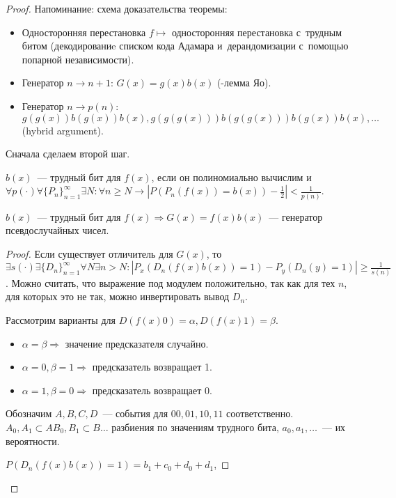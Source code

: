 \documentclass{article}
\begin{document}
\begin{proof}
	Напоминание: схема доказательства теоремы:
	\begin{itemize}
		\item Односторонняя перестановка $f \mapsto$ односторонняя перестановка
			с~трудным битом (декодированиe списком кода Адамара и~дерандомизации
			с~помощью попарной независимости).
		\item Генератор $n \rightarrow n + 1$: $G(x) = g(x) b(x)$ (-лемма
			Яо).
		\item Генератор $n \rightarrow p(n)$: $g(g(x))b(g(x))b(x),
			g(g(g(x)))b(g(g(x)))b(g(x))b(x), \ldots$ (hybrid argument).

	\end{itemize}
	Сначала сделаем второй шаг.

	\begin{definition}
		$b(x)$~--- трудный бит для $f(x)$, если он полиномиально вычислим
		и~$\forall p(\cdot) \forall \{P_n\}_{n=1}^{\infty} \exists N:
		\forall n \ge N \rightarrow \left| P(P_n(f(x)) = b(x)) -
		\frac{1}{2}\right| < \frac{1}{p(n)}$.
	\end{definition}
	\begin{lemma}
		$b(x)$~--- трудный бит для $f(x) \Rightarrow G(x) = f(x) b(x)$~--- генератор
		псевдослучайных чисел.
	\end{lemma}
	\begin{proof}
		Если существует отличитель для $G(x)$, то $\exists s(\cdot) \exists
		\{D_n\}_{n=1}^{\infty} \forall N \exists n > N: \left| P_x(D_n(f(x)b(x)) = 1)
		- P_y(D_n(y) = 1)\right| \ge \frac{1}{s(n)}$. Можно считать, что выражение
		под модулем положительно, так как для тех $n$, для которых это не так, можно
		инвертировать вывод $D_n$.

		Рассмотрим варианты для $D(f(x)0) = \alpha, D(f(x)1) = \beta$.
		\begin{itemize}
			\item $\alpha = \beta \Rightarrow$ значение предсказателя случайно.
			\item $\alpha = 0, \beta = 1 \Rightarrow$ предсказатель возвращает 1.
			\item $\alpha = 1, \beta = 0 \Rightarrow$ предсказатель возвращает 0.
		\end{itemize}
		Обозначим $A, B, C, D$~--- события для $00, 01, 10, 11$ соответственно.
		$A_0, A_1 \subset A B_0, B_1 \subset B \ldots$ разбиения по значениям
		трудного бита, $a_0, a_1, \ldots$~--- их вероятности.

		$P(D_n(f(x)b(x)) = 1) = b_1 + c_0 + d_0 + d_1$,


\end{proof}
\end{proof}
\end{document}
